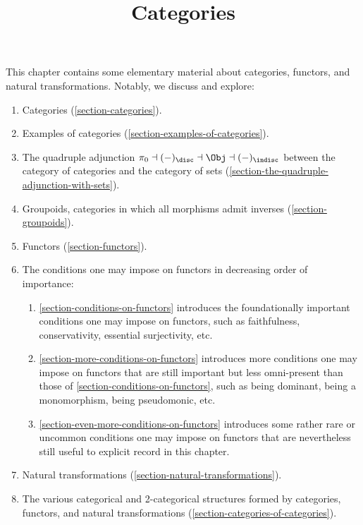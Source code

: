 

%



\title{Categories}

\maketitle

\label{section-phantom}

This chapter contains some elementary material about categories, functors, and natural transformations. Notably, we discuss and explore:
\begin{enumerate}
    \item\label{categories-introduction-item-1}Categories (\cref{section-categories}).
    \item\label{categories-introduction-item-2}Examples of categories (\cref{section-examples-of-categories}).
    \item\label{categories-introduction-item-3}The quadruple adjunction $\pi_{0}\dashv{(-)_{\disc}}\dashv\Obj\dashv{(-)_{\indisc}}$ between the category of categories and the category of sets (\cref{section-the-quadruple-adjunction-with-sets}).
    \item\label{categories-introduction-item-4}Groupoids, categories in which all morphisms admit inverses (\cref{section-groupoids}).
    \item\label{categories-introduction-item-5}Functors (\cref{section-functors}).
    \item\label{categories-introduction-item-6}The conditions one may impose on functors in decreasing order of importance:
        \begin{enumerate}
            \item\label{categories-introduction-item-6-a}\cref{section-conditions-on-functors} introduces the foundationally important conditions one may impose on functors, such as faithfulness, conservativity, essential surjectivity, etc.
            \item\label{categories-introduction-item-6-b}\cref{section-more-conditions-on-functors} introduces more conditions one may impose on functors that are still important but less omni-present than those of \cref{section-conditions-on-functors}, such as being dominant, being a monomorphism, being pseudomonic, etc.
            \item\label{categories-introduction-item-6-c}\cref{section-even-more-conditions-on-functors} introduces some rather rare or uncommon conditions one may impose on functors that are nevertheless still useful to explicit record in this chapter.
        \end{enumerate}
    \item\label{categories-introduction-item-7}Natural transformations (\cref{section-natural-transformations}).
    \item\label{categories-introduction-item-8}The various categorical and 2-categorical structures formed by categories, functors, and natural transformations (\cref{section-categories-of-categories}).
\end{enumerate}
